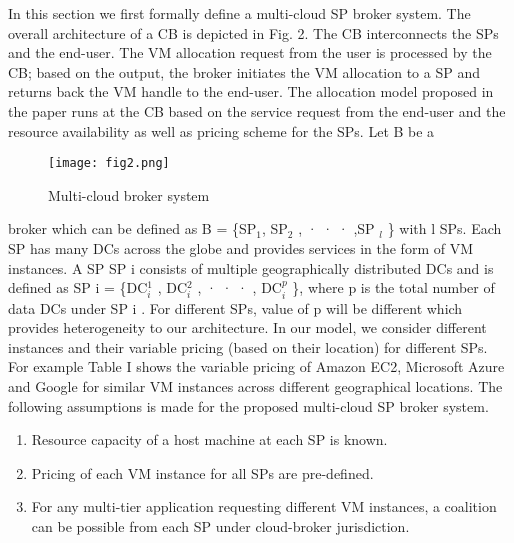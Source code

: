 \documentclass[conference]{IEEEtran}
\newcommand\tab[1][0.8cm]{\hspace*{#1}}
\begin{document}
\tab In this section we first formally define a multi-cloud SP
broker system. The overall architecture of a CB is depicted in
Fig. 2. The CB interconnects the SPs and the end-user. The
VM allocation request from the user is processed by the CB;
based on the output, the broker initiates the VM allocation to
a SP and returns back the VM handle to the end-user. The
allocation model proposed in the paper runs at the CB based
on the service request from the end-user and the resource
availability as well as pricing scheme for the SPs. Let B be a
\begin{figure}[htbp]
	\centerline{\texttt{[image: fig2.png]}}
	\caption{Multi-cloud broker system}
	\label{fig}
\end{figure}
\newline
broker which can be defined as B = \{SP${_{1}}$, SP${_{2}}$ , · · · ,SP ${_{l}}$ \}
with l SPs. Each SP has many DCs across the globe and
provides services in the form of VM instances. A SP SP i
consists of multiple geographically distributed DCs and is
defined as SP i = \{DC$^1_i$ , DC$^2_i$ , · · · , DC$^p_i$ \}, where p is the
total number of data DCs under SP i . For different SPs, value
of p will be different which provides heterogeneity to our architecture.  In our model, we
consider different instances and their variable pricing (based
on their location) for different SPs. For example Table I shows
the variable pricing of Amazon EC2, Microsoft Azure and
Google for similar VM instances across different geographical
locations. The following assumptions is made for the proposed
multi-cloud SP broker system.
\begin{enumerate}
	\item Resource capacity of a host machine at each SP is
	known.
	\item Pricing of each VM instance for all SPs are pre-defined.
	\item For any multi-tier application requesting different VM
	instances, a coalition can be possible from each SP under
	cloud-broker jurisdiction.
\end{enumerate}
\end{document}

